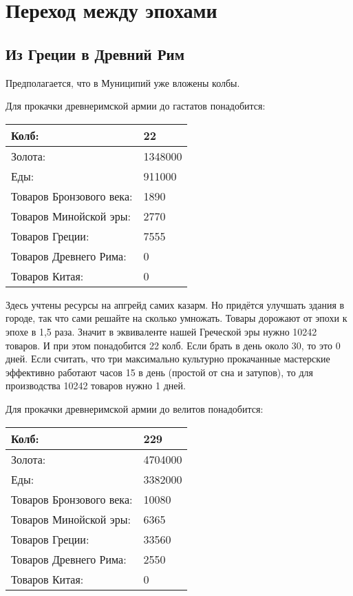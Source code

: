 \section{Переход между эпохами}
\label{section:epochs} 

\subsection{Из Греции в Древний Рим}

Предполагается, что в Муниципий уже вложены колбы.

Для прокачки древнеримской армии до гастатов понадобится:

\begin{center}
    \begin{tabular}[h!]{|l|l|}
        \hline
        Колб:                    & 22\\\hline
        Золота:                  & 1348000\\\hline
        Еды:                     & 911000\\\hline
        Товаров Бронзового века: & 1890\\\hline
        Товаров Минойской эры:   & 2770\\\hline
        Товаров Греции:          & 7555\\\hline
        Товаров Древнего Рима:   & 0\\\hline
        Товаров Китая:           & 0\\\hline
    \end{tabular}
\end{center}

Здесь учтены ресурсы на апгрейд самих казарм.
Но придётся улучшать здания в городе, так что сами решайте на сколько умножать.
Товары дорожают от эпохи к эпохе в 1,5 раза.
Значит в эквиваленте нашей Греческой эры нужно 10242 товаров.
И при этом понадобится 22 колб. Если брать в день около 30, то это 0 дней.
Если считать, что три максимально культурно прокачанные мастерские эффективно работают часов 15 в день (простой от сна и затупов),
то для производства 10242 товаров нужно 1 дней.



Для прокачки древнеримской армии до велитов понадобится:

\begin{center}
    \begin{tabular}[h!]{|l|l|}
        \hline
        Колб:                    & 229\\\hline
        Золота:                  & 4704000\\\hline
        Еды:                     & 3382000\\\hline
        Товаров Бронзового века: & 10080\\\hline
        Товаров Минойской эры:   & 6365\\\hline
        Товаров Греции:          & 33560\\\hline
        Товаров Древнего Рима:   & 2550\\\hline
        Товаров Китая:           & 0\\\hline
    \end{tabular}
\end{center}

